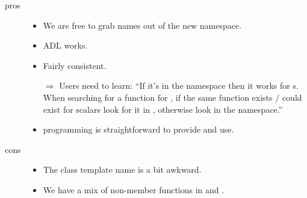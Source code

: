 \begin{description}
  \item[pros]
    \begin{itemize}
      \item We are free to grab names out of the new namespace.
      \item ADL works.
      \item Fairly consistent.
      \item[$\Rightarrow$] Users need to learn: “If it's in the \std{}
        namespace then it works for s.
        When searching for a function for , if the same function
        exists / could exist for scalars look for it in , otherwise
        look in the \std{} namespace.”
      \item \simdgeneric programming is straightforward to provide and use.
    \end{itemize}

  \item[cons]
    \begin{itemize}
      \item The class template name \std{} is a bit awkward.

      \item We have a mix of non-member functions in  and
        \std{}.
    \end{itemize}
\end{description}

